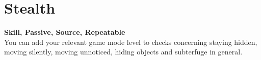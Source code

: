 \section{Stealth}\label{sec:stealth}
\textbf{Skill, Passive, Source, Repeatable}\\
You can add your relevant game mode level to checks concerning staying hidden, moving silently, moving unnoticed, hiding objects and subterfuge in general.